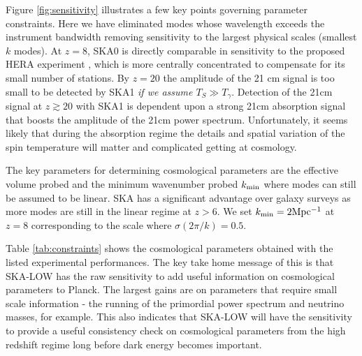\documentclass{PoS}
\begin{document}
Figure \ref{fig:sensitivity} illustrates a few key points governing parameter constraints. Here we have eliminated modes whose wavelength exceeds the instrument bandwidth removing sensitivity to the largest physical scales (smallest $k$ modes). At $z=8$, SKA0 is directly comparable in sensitivity to the proposed HERA experiment \cite{2014ApJ...782...66P}, which is more centrally concentrated to compensate for its small number of stations. By $z=20$ the amplitude of the 21 cm signal is too small to be detected by SKA1 {\em if we assume $T_S\gg T_\gamma$}. Detection of the 21cm signal at $z\gtrsim20$ with SKA1 is dependent upon a strong 21cm absorption signal that boosts the amplitude of the 21cm power spectrum. Unfortunately, it seems likely that during the absorption regime the details and spatial variation of the spin temperature will matter and complicated getting at cosmology.

The key parameters for determining cosmological parameters are the effective volume probed and the minimum wavenumber probed $k_{\rm min}$ where modes can still be assumed to be linear. SKA has a significant advantage over galaxy surveys as more modes are still in the linear regime at $z>6$. We set $k_{\rm min}=2{\rm Mpc^{-1}}$ at $z=8$ corresponding to the scale where $\sigma(2\pi/k)=0.5$.

Table \ref{tab:constraints} shows the cosmological parameters obtained with the listed experimental performances. The key take home message of this is that SKA-LOW has the raw sensitivity to add useful information on cosmological parameters to Planck. The largest gains are on parameters that require small scale information - the running of the primordial power spectrum and neutrino masses, for example. This also indicates that SKA-LOW will have the sensitivity to provide a useful consistency check on cosmological parameters from the high redshift regime long before dark energy becomes important.
\end{document}
